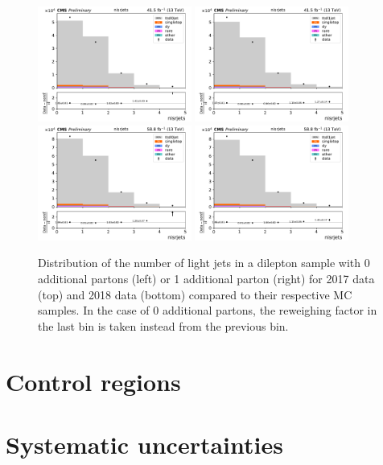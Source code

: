   \begin{figure}[h!]
  \centering
  \includegraphics[width=0.45\textwidth]{figs/ftan/isr/y2017_isrrw_nisrjets0.pdf}
  \includegraphics[width=0.45\textwidth]{figs/ftan/isr/y2017_isrrw_nisrjets1.pdf} \\
  \includegraphics[width=0.45\textwidth]{figs/ftan/isr/y2018_isrrw_nisrjets0.pdf}
  \includegraphics[width=0.45\textwidth]{figs/ftan/isr/y2018_isrrw_nisrjets1.pdf}
  \caption{
      Distribution of the number of light jets in a dilepton \ttbar sample with 0
      additional partons (left) or 1 additional parton (right) for 2017 data
      (top) and 2018 data (bottom) compared to their respective MC samples.
      In the case of 0 additional partons, the reweighing factor in the last bin
      is taken instead from the previous bin.
  }
  \label{fig:isrweight2}
  \end{figure}

\FloatBarrier

\section{Control regions}

\FloatBarrier

\section{Systematic uncertainties}

\FloatBarrier
